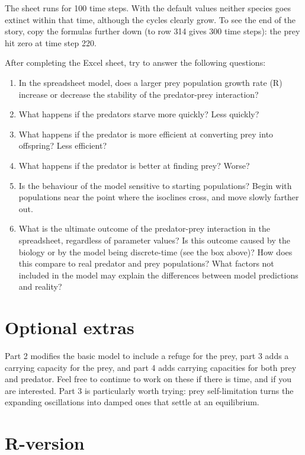 \documentclass[
  a4paper]{book}
\providecommand{\tightlist}{%
  \setlength{\itemsep}{0pt}\setlength{\parskip}{0pt}}
\begin{document}
The sheet runs for 100 time steps. With the default values neither species goes extinct within that time, although the cycles clearly grow. To see the end of the story, copy the formulas further down (to row 314 gives 300 time steps): the prey hit zero at time step 220.

After completing the Excel sheet, try to answer the following questions:

\begin{enumerate}
\def\labelenumi{\arabic{enumi}.}
\tightlist
\item
  In the spreadsheet model, does a larger prey population growth rate (R) increase or decrease the stability of the predator-prey interaction?
\item
  What happens if the predators starve more quickly? Less quickly?
\item
  What happens if the predator is more efficient at converting prey into offspring? Less efficient?
\item
  What happens if the predator is better at finding prey? Worse?
\item
  Is the behaviour of the model sensitive to starting populations? Begin with populations near the point where the isoclines cross, and move slowly farther out.
\item
  What is the ultimate outcome of the predator-prey interaction in the spreadsheet, regardless of parameter values? Is this outcome caused by the biology or by the model being discrete-time (see the box above)? How does this compare to real predator and prey populations? What factors not included in the model may explain the differences between model predictions and reality?
\end{enumerate}

\section{Optional extras}\label{optional-extras}

Part 2 modifies the basic model to include a refuge for the prey, part 3 adds a carrying capacity for the prey, and part 4 adds carrying capacities for both prey and predator. Feel free to continue to work on these if there is time, and if you are interested. Part 3 is particularly worth trying: prey self-limitation turns the expanding oscillations into damped ones that settle at an equilibrium.

\section{R-version}\label{r-version}
\end{document}
